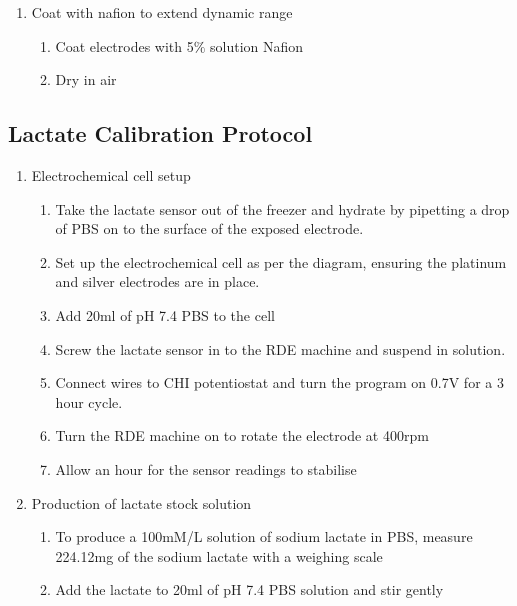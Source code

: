 \begin{appendices}
\begin{enumerate}
    \item Coat with nafion to extend dynamic range
        \begin{enumerate}
            \item Coat electrodes with 5$\%$ solution Nafion
            \item Dry in air
        \end{enumerate}
\end{enumerate}

\subsection{Lactate Calibration Protocol}

\begin{enumerate}
    \item Electrochemical cell setup
        \begin{enumerate}
            \item Take the lactate sensor out of the freezer and hydrate by pipetting a drop of PBS on to the surface of the exposed electrode.
            \item Set up the electrochemical cell as per the diagram, ensuring the platinum and silver electrodes are in place.
            \item Add 20ml of pH 7.4 PBS to the cell 
            \item Screw the lactate sensor in to the RDE machine and suspend in solution.
            \item Connect wires to CHI potentiostat and turn the program on 0.7V for a 3 hour cycle.
            \item Turn the RDE machine on to rotate the electrode at 400rpm
            \item Allow an hour for the sensor readings to stabilise
        \end{enumerate}
        
    \item Production of lactate stock solution
        \begin{enumerate}
            \item To produce a 100mM/L solution of sodium lactate in PBS, measure 224.12mg of the sodium lactate with a weighing scale
            \item Add the lactate to 20ml of pH 7.4 PBS solution and stir gently
        \end{enumerate}
    

\end{enumerate}
\end{appendices}
